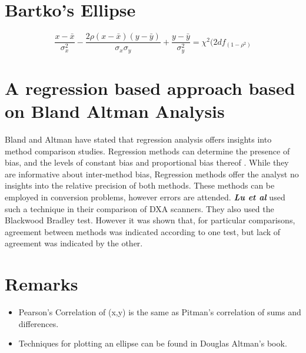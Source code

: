 \documentclass[MAIN.tex]{subfiles}
\begin{document}
	
	
	
	
	
	\section*{Bartko's Ellipse}
	
	\[ \frac{x - \bar{x}}{\sigma^2_x} - \frac{2\rho(x - \bar{x})(y - \bar{y})}{\sigma_x \sigma_y} + \frac{y - \bar{y}}{\sigma^2_y} = \chi^2(2df_(1-\rho^2) \]
	
	

	\section{A regression based approach based on Bland Altman Analysis}
	Bland and Altman have stated that regression analysis offers insights into method comparison studies. Regression methods can determine the presence of bias, and the levels of constant bias and proportional bias thereof \cite{ludbrook97,ludbrook02}.
	While they are informative about inter-method bias, Regression methods offer the analyst no insights into the relative precision of both methods. These methods can be employed in conversion problems, however errors are
	attended.
	\emph{\textbf{Lu et al}} used such a technique in their comparison of DXA scanners. They also used the Blackwood Bradley test. However it was shown that, for particular comparisons, agreement between methods was indicated according to one test, but lack of agreement was indicated by the other.
	

	
	\section*{Remarks}
	\begin{itemize}
		\item Pearson's Correlation of (x,y) is the same as Pitman's correlation of sums and differences.
		
		\item Techniques for plotting an ellipse can be found in Douglas Altman's book.
	\end{itemize}
\end{document}
